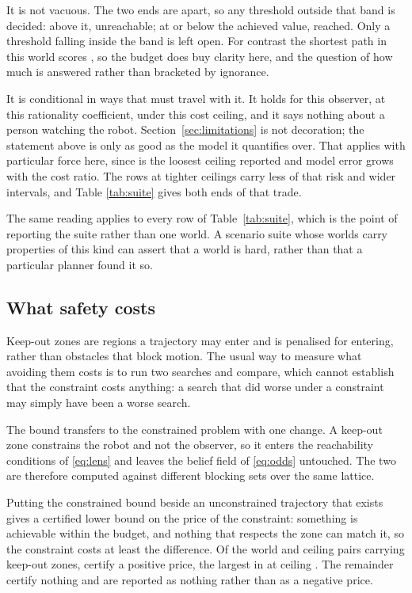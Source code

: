 \documentclass[journal]{IEEEtran}
\begin{document}
It is not vacuous. The two ends are \exampleGap{} apart, so any threshold
outside that band is decided: above it, unreachable; at or below the achieved
value, reached. Only a threshold falling inside the band is left open. For
contrast the shortest path in this world scores \exampleBaseline{}, so the
budget does buy clarity here, and the question of how much is answered rather
than bracketed by ignorance.

It is conditional in ways that must travel with it. It holds for this observer,
at this rationality coefficient, under this cost ceiling, and it says nothing
about a person watching the robot. Section~\ref{sec:limitations} is not
decoration; the statement above is only as good as the model it quantifies
over. That applies with particular force here, since \exampleCeiling{} is the
loosest ceiling reported and model error grows with the cost ratio. The rows at
tighter ceilings carry less of that risk and wider intervals, and Table
\ref{tab:suite} gives both ends of that trade.

The same reading applies to every row of Table~\ref{tab:suite}, which is the
point of reporting the suite rather than one world. A scenario suite whose
worlds carry properties of this kind can assert that a world is hard, rather
than that a particular planner found it so.

\subsection{What safety costs}

Keep-out zones are regions a trajectory may enter and is penalised for
entering, rather than obstacles that block motion. The usual way to measure
what avoiding them costs is to run two searches and compare, which cannot
establish that the constraint costs anything: a search that did worse under a
constraint may simply have been a worse search.

The bound transfers to the constrained problem with one change. A keep-out
zone constrains the robot and not the observer, so it enters the reachability
conditions of \eqref{eq:lens} and leaves the belief field of \eqref{eq:odds}
untouched. The two are therefore computed against different blocking sets over
the same lattice.

Putting the constrained bound beside an unconstrained trajectory that exists
gives a certified lower bound on the price of the constraint: something is
achievable within the budget, and nothing that respects the zone can match it,
so the constraint costs at least the difference. Of the \safetyPairs{} world
and ceiling pairs carrying keep-out zones, \safetyPriced{} certify a positive
price, the largest \safetyLargestPrice{} in \safetyLargestWorld{} at ceiling
\safetyLargestCeiling{}. The remainder certify nothing and are reported as
nothing rather than as a negative price.
\end{document}
